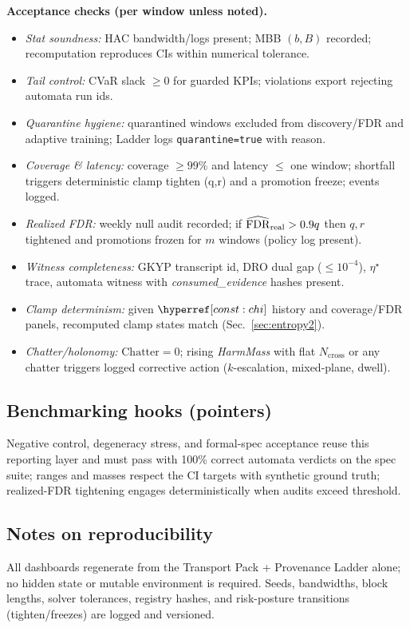 \begin{mdframed}
\textbf{Acceptance checks (per window unless noted).}
\begin{itemize}[leftmargin=*]
\item \emph{Stat soundness:} HAC bandwidth/logs present; MBB $(b,B)$ recorded; recomputation reproduces CIs within numerical tolerance.
\item \emph{Tail control:} CVaR slack $\ge 0$ for guarded KPIs; violations export rejecting automata run ids.
\item \emph{Quarantine hygiene:} quarantined windows excluded from discovery/FDR and adaptive training; Ladder logs \texttt{quarantine=true} with reason.
\item \emph{Coverage \& latency:} coverage $\ge 99\%$ and latency $\le$ one window; shortfall triggers deterministic clamp tighten (q,r) and a promotion freeze; events logged.
\item \emph{Realized FDR:} weekly null audit recorded; if $\widehat{\mathrm{FDR}}_{\mathrm{real}}>0.9q$ then $q,r$ tightened and promotions frozen for $m$ windows (policy log present).
\item \emph{Witness completeness:} GKYP transcript id, DRO dual gap ($\le 10^{-4}$), $\eta^\star$ trace, automata witness with \emph{consumed\_evidence} hashes present.
\item \emph{Clamp determinism:} given $\constref{chi}$ history and coverage/FDR panels, recomputed clamp states match (Sec.~\ref{sec:entropy2}).
\item \emph{Chatter/holonomy:} $\mathrm{Chatter}=0$; rising \emph{HarmMass} with flat $N_{\mathrm{cross}}$ or any chatter triggers logged corrective action ($k$-escalation, mixed-plane, dwell).
\end{itemize}
\end{mdframed}

\subsection*{Benchmarking hooks (pointers)}
Negative control, degeneracy stress, and formal-spec acceptance reuse this reporting layer and must pass with 100\% correct automata verdicts on the spec suite; ranges and masses respect the CI targets with synthetic ground truth; realized-FDR tightening engages deterministically when audits exceed threshold.

\subsection*{Notes on reproducibility}
All dashboards regenerate from the Transport Pack + Provenance Ladder alone; no hidden state or mutable environment is required. Seeds, bandwidths, block lengths, solver tolerances, registry hashes, and risk-posture transitions (tighten/freezes) are logged and versioned.
